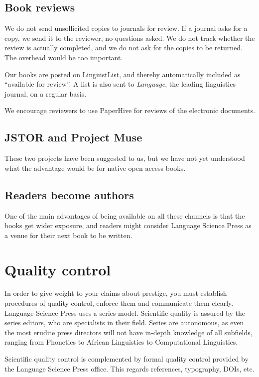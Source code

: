\documentclass[nonflat,modfonts,output=book] {langsci/langscibook}
\begin{document}
\subsection{Book reviews}
We do not send unsollicited copies to journals for review. If a journal asks for a copy, we send it to the reviewer, no questions asked. We do not track whether the review is actually completed, and we do not ask for the copies to be returned. The overhead would be too important. 

Our books are posted on LinguistList, and thereby automatically included as ``available for review''. A list is also sent to \textit{Language}, the leading linguistics journal, on a regular basis. 

We encourage reviewers to use PaperHive for reviews of the electronic documents.

                      
\subsection{JSTOR and Project Muse}                      
These two projects have been suggested to us, but we have not yet understood what the advantage would be for native open access books.


\subsection{Readers become authors}
One of the main advantages of being available on all these channels is that the books get wider exposure, and readers might consider Language Science Press as a venue for their next book to be written.  

\section{Quality control}\label{sec:qualitycontrol}
In order to give weight to your claims about prestige, you must establish procedures of quality control, enforce them and communicate them clearly. Language Science Press uses a series model. Scientific quality is assured by the series editors, who are specialists in their field. Series are autonomous, as even the most erudite press directors will not have in-depth knowledge of all subfields, ranging from Phonetics to African Linguistics to Computational Linguistics. 

Scientific quality control is complemented by formal quality control provided by the Language Science Press office. This regards references, typography, DOIs, etc. 
\end{document}
